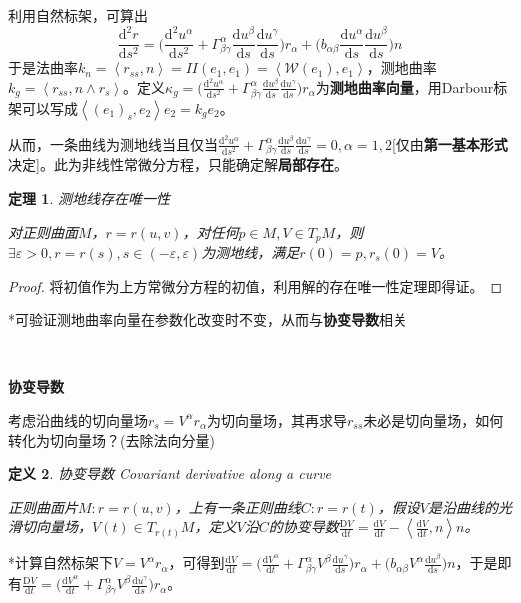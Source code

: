 \documentclass[a4paper,UTF8,fontset=windows]{ctexart}
\newtheorem{thm}{定理}[section]
\newtheorem{dfn}[thm]{定义}
\begin{document}
利用自然标架，可算出$$\frac{\mathrm{d}^2r}{\mathrm{d}s^2}=\bigg(\frac{\mathrm{d}^2u^\alpha}{\mathrm{d}s^2}+\Gamma_{\beta\gamma}^\alpha\frac{\mathrm{d}u^\beta}{\mathrm{d}s}\frac{\mathrm{d}u^\gamma}{\mathrm{d}s}\bigg)r_\alpha+\bigg(b_{\alpha\beta}\frac{\mathrm{d}u^\alpha}{\mathrm{d}s}\frac{\mathrm{d}u^\beta}{\mathrm{d}s}\bigg)n$$
于是法曲率$k_n=\left<r_{ss},n\right>=II(e_1,e_1)=\left<\mathcal{W}(e_1),e_1\right>$，测地曲率$k_g=\left<r_{ss},n\wedge r_s\right>$。定义$\kappa_g=\big(\frac{\mathrm{d}^2u^\alpha}{\mathrm{d}s^2}+\Gamma_{\beta\gamma}^\alpha\frac{\mathrm{d}u^\beta}{\mathrm{d}s}\frac{\mathrm{d}u^\gamma}{\mathrm{d}s}\big)r_\alpha$为\textbf{测地曲率向量}，用Darbour标架可以写成$\left<(e_1)_s,e_2\right>e_2=k_ge_2$。

从而，一条曲线为测地线当且仅当$\frac{\mathrm{d}^2u^\alpha}{\mathrm{d}s^2}+\Gamma_{\beta\gamma}^\alpha\frac{\mathrm{d}u^\beta}{\mathrm{d}s}\frac{\mathrm{d}u^\gamma}{\mathrm{d}s}=0,\alpha=1,2$[仅由\textbf{第一基本形式}决定]。此为非线性常微分方程，只能确定解\textbf{局部存在}。

\begin{thm} 测地线存在唯一性

对正则曲面$M$，$r=r(u,v)$，对任何$p\in M,V\in T_pM$，则$\exists\varepsilon>0,r=r(s),s\in(-\varepsilon,\varepsilon)$为测地线，满足$r(0)=p,r_s(0)=V$。
\end{thm}

\begin{proof}
将初值作为上方常微分方程的初值，利用解的存在唯一性定理即得证。
\end{proof}

*可验证测地曲率向量在参数化改变时不变，从而与\textbf{协变导数}相关

\

\textbf{协变导数}

考虑沿曲线的切向量场$r_s=V^\alpha r_\alpha$为切向量场，其再求导$r_{ss}$未必是切向量场，如何转化为切向量场？(去除法向分量)

\begin{dfn} 协变导数 Covariant derivative along a curve

正则曲面片$M:r=r(u,v)$，上有一条正则曲线$C:r=r(t)$，假设$V$是沿曲线的光滑切向量场，$V(t)\in T_{r(t)}M$，定义$V$沿$C$的协变导数$\frac{\mathrm{D}V}{\mathrm{d}t}=\frac{\mathrm{d}V}{\mathrm{d}t}-\left<\frac{\mathrm{d}V}{\mathrm{d}t},n\right>n$。
\end{dfn}

*计算自然标架下$V=V^\alpha r_\alpha$，可得到$\frac{\mathrm{d}V}{\mathrm{d}t}=\big(\frac{\mathrm{d}V^\alpha}{\mathrm{d}t}+\Gamma_{\beta\gamma}^\alpha V^\beta\frac{\mathrm{d}u^\gamma}{\mathrm{d}s}\big)r_\alpha+\big(b_{\alpha\beta}V^\alpha\frac{\mathrm{d}u^\beta}{\mathrm{d}s}\big)n$，于是即有$\frac{\mathrm{D}V}{\mathrm{d}t}=\big(\frac{\mathrm{d}V^\alpha}{\mathrm{d}t}+\Gamma_{\beta\gamma}^\alpha V^\beta\frac{\mathrm{d}u^\gamma}{\mathrm{d}s}\big)r_\alpha$。
\end{document}
